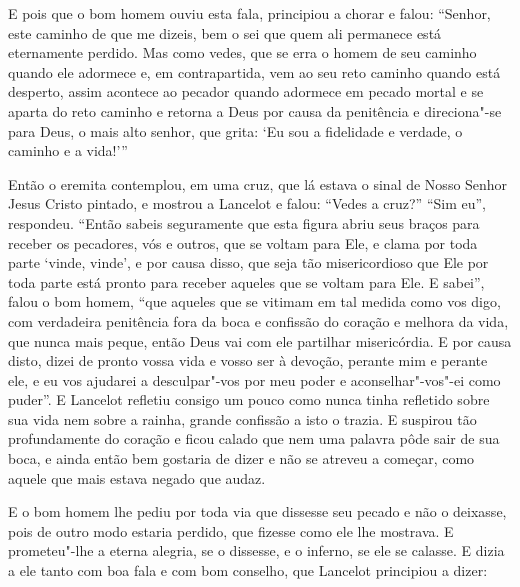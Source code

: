 E pois que o bom homem ouviu esta fala, principiou a chorar e falou: “Senhor,
este caminho de que me dizeis, bem o sei que quem ali permanece está
eternamente perdido. Mas como vedes, que se erra o homem de seu caminho quando
ele adormece e, em contrapartida, vem ao seu reto caminho quando está desperto,
assim acontece ao pecador quando adormece em pecado mortal e se aparta do reto
caminho e retorna a Deus por causa da penitência e direciona"-se para Deus, o
mais alto senhor, que grita: ‘Eu sou a fidelidade e verdade, o caminho e a
vida!'” 

Então o eremita contemplou, em uma cruz, que lá estava o sinal de Nosso Senhor
Jesus Cristo pintado, e mostrou a Lancelot e falou: “Vedes a cruz?” “Sim eu”,
respondeu. “Então sabeis seguramente que esta figura abriu seus braços para
receber os pecadores, vós e outros, que se voltam para Ele, e clama por toda
parte ‘vinde, vinde’, e por causa disso, que seja tão misericordioso que Ele
por toda parte está pronto para receber aqueles que se voltam para Ele. E
sabei”, falou o bom homem, “que aqueles que se vitimam em tal medida como vos
digo, com verdadeira penitência fora da boca e confissão do coração e melhora
da vida, que nunca mais peque, então Deus vai com ele partilhar misericórdia. E
por causa disto, dizei de pronto vossa vida e vosso ser à devoção, perante mim
e perante ele, e eu vos ajudarei a desculpar"-vos por meu poder e
aconselhar"-vos"-ei como puder”. E Lancelot refletiu consigo um pouco
como nunca tinha refletido sobre sua vida nem sobre a rainha, grande confissão
a isto o trazia. E suspirou tão profundamente do coração e ficou
calado que nem uma palavra pôde sair de sua boca, e ainda então bem gostaria de
dizer e não se atreveu a começar, como aquele que mais estava negado que audaz.


E o bom homem lhe pediu por toda via que dissesse seu pecado e não o deixasse,
pois de outro modo estaria perdido, que fizesse como ele lhe mostrava. E
prometeu"-lhe a eterna alegria, se o dissesse, e o inferno, se ele se calasse. E
dizia a ele tanto com boa fala e com bom conselho, que Lancelot principiou a
dizer: 

